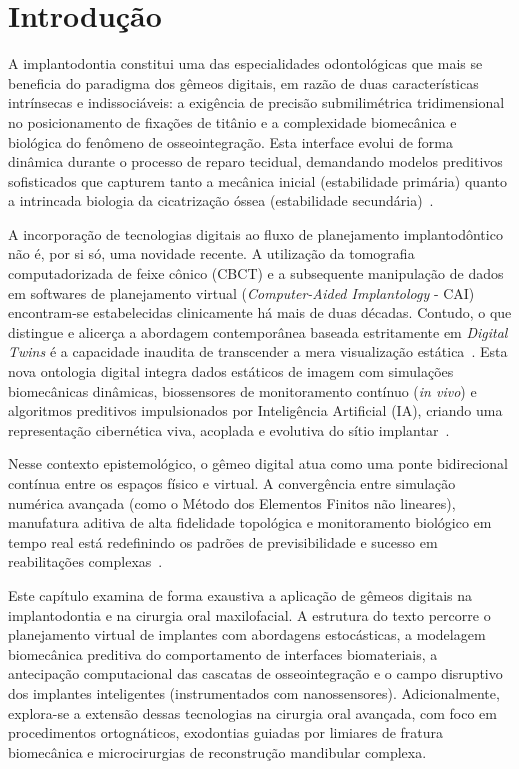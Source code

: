 \section{Introdução}

A implantodontia constitui uma das especialidades odontológicas que mais se beneficia do paradigma dos gêmeos digitais, em razão de duas características intrínsecas e indissociáveis: a exigência de precisão submilimétrica tridimensional no posicionamento de fixações de titânio e a complexidade biomecânica e biológica do fenômeno de osseointegração.  Esta interface evolui de forma dinâmica durante o processo de reparo tecidual, demandando modelos preditivos sofisticados que capturem tanto a mecânica inicial (estabilidade primária) quanto a intrincada biologia da cicatrização óssea (estabilidade secundária)~\cite{khoshfekr2025digital}. 

A incorporação de tecnologias digitais ao fluxo de planejamento implantodôntico não é, por si só, uma novidade recente. A utilização da tomografia computadorizada de feixe cônico (CBCT) e a subsequente manipulação de dados em softwares de planejamento virtual (\textit{Computer-Aided Implantology} - CAI) encontram-se estabelecidas clinicamente há mais de duas décadas. Contudo, o que distingue e alicerça a abordagem contemporânea baseada estritamente em \textit{Digital Twins} é a capacidade inaudita de transcender a mera visualização estática~\cite{techsoc2025precision}. Esta nova ontologia digital integra dados estáticos de imagem com simulações biomecânicas dinâmicas, biossensores de monitoramento contínuo (\textit{in vivo}) e algoritmos preditivos impulsionados por Inteligência Artificial (IA), criando uma representação cibernética viva, acoplada e evolutiva do sítio implantar~\cite{duggal2026exploring}. 

Nesse contexto epistemológico, o gêmeo digital atua como uma ponte bidirecional contínua entre os espaços físico e virtual. A convergência entre simulação numérica avançada (como o Método dos Elementos Finitos não lineares), manufatura aditiva de alta fidelidade topológica e monitoramento biológico em tempo real está redefinindo os padrões de previsibilidade e sucesso em reabilitações complexas~\cite{mdpi2025convergence}. 

Este capítulo examina de forma exaustiva a aplicação de gêmeos digitais na implantodontia e na cirurgia oral maxilofacial. A estrutura do texto percorre o planejamento virtual de implantes com abordagens estocásticas, a modelagem biomecânica preditiva do comportamento de interfaces biomateriais, a antecipação computacional das cascatas de osseointegração e o campo disruptivo dos implantes inteligentes (instrumentados com nanossensores). Adicionalmente, explora-se a extensão dessas tecnologias na cirurgia oral avançada, com foco em procedimentos ortognáticos, exodontias guiadas por limiares de fratura biomecânica e microcirurgias de reconstrução mandibular complexa.
